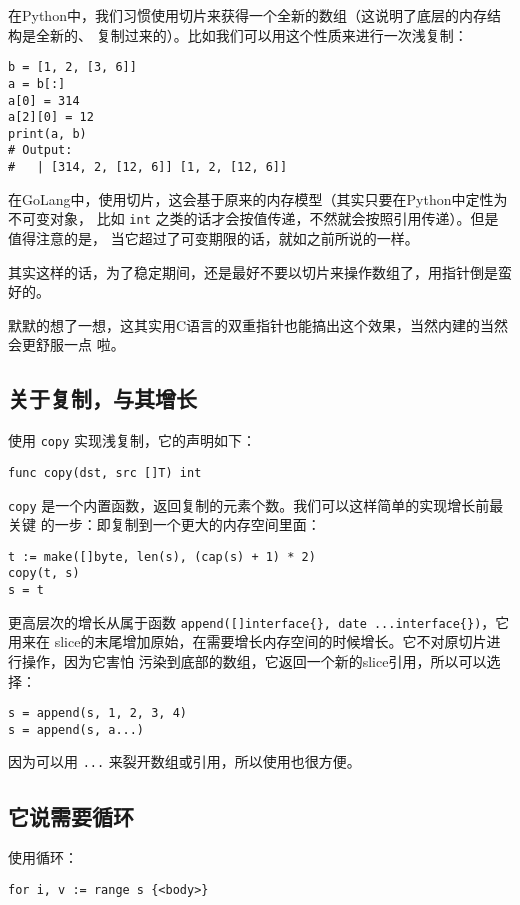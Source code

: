 在Python中，我们习惯使用切片来获得一个全新的数组（这说明了底层的内存结构是全新的、
复制过来的）。比如我们可以用这个性质来进行一次浅复制：
\begin{lstlisting}
b = [1, 2, [3, 6]]
a = b[:]
a[0] = 314
a[2][0] = 12
print(a, b)
# Output:
#   | [314, 2, [12, 6]] [1, 2, [12, 6]]
\end{lstlisting}

在GoLang中，使用切片，这会基于原来的内存模型（其实只要在Python中定性为不可变对象，
比如 \verb|int| 之类的话才会按值传递，不然就会按照引用传递）。但是值得注意的是，
当它超过了可变期限的话，就如之前所说的一样。

其实这样的话，为了稳定期间，还是最好不要以切片来操作数组了，用指针倒是蛮好的。

默默的想了一想，这其实用C语言的双重指针也能搞出这个效果，当然内建的当然会更舒服一点
啦。

\subsection{关于复制，与其增长}

使用 \verb|copy| 实现浅复制，它的声明如下：
\begin{lstlisting}
func copy(dst, src []T) int
\end{lstlisting}

\verb|copy| 是一个内置函数，返回复制的元素个数。我们可以这样简单的实现增长前最关键
的一步：即复制到一个更大的内存空间里面：
\begin{lstlisting}
t := make([]byte, len(s), (cap(s) + 1) * 2)
copy(t, s)
s = t
\end{lstlisting}

更高层次的增长从属于函数 \verb|append([]interface{}, date ...interface{})|，它用来在
slice的末尾增加原始，在需要增长内存空间的时候增长。它不对原切片进行操作，因为它害怕
污染到底部的数组，它返回一个新的slice引用，所以可以选择：
\begin{lstlisting}
s = append(s, 1, 2, 3, 4)
s = append(s, a...)
\end{lstlisting}

因为可以用 \verb|...| 来裂开数组或引用，所以使用也很方便。

\subsection{它说需要循环}

使用循环：
\begin{lstlisting}
for i, v := range s {<body>}
\end{lstlisting}

